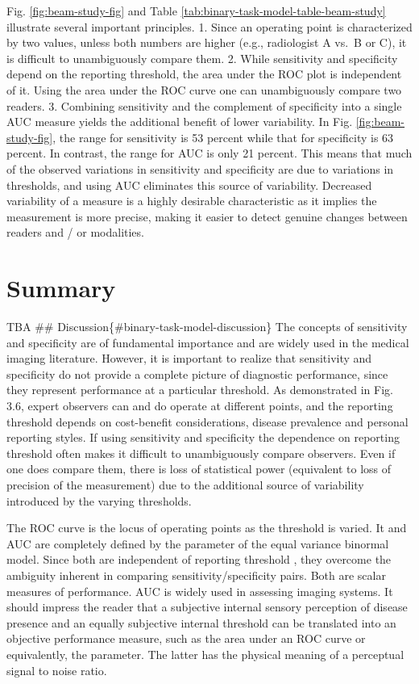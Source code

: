 \documentclass[
]{book}
\begin{document}
Fig. \ref{fig:beam-study-fig} and Table \ref{tab:binary-task-model-table-beam-study} illustrate several important principles.
1. Since an operating point is characterized by two values, unless both numbers are higher (e.g., radiologist A vs.~B or C), it is difficult to unambiguously compare them.
2. While sensitivity and specificity depend on the reporting threshold, the area under the ROC plot is independent of it. Using the area under the ROC curve one can unambiguously compare two readers.
3. Combining sensitivity and the complement of specificity into a single AUC measure yields the additional benefit of lower variability. In Fig. \ref{fig:beam-study-fig}, the range for sensitivity is 53 percent while that for specificity is 63 percent. In contrast, the range for AUC is only 21 percent. This means that much of the observed variations in sensitivity and specificity are due to variations in thresholds, and using AUC eliminates this source of variability. Decreased variability of a measure is a highly desirable characteristic as it implies the measurement is more precise, making it easier to detect genuine changes between readers and / or modalities.

\hypertarget{binary-task-model-summary}{%
\section{Summary}\label{binary-task-model-summary}}

TBA
\#\# Discussion\{\#binary-task-model-discussion\}
The concepts of sensitivity and specificity are of fundamental importance and are widely used in the medical imaging literature. However, it is important to realize that sensitivity and specificity do not provide a complete picture of diagnostic performance, since they represent performance at a particular threshold. As demonstrated in Fig. 3.6, expert observers can and do operate at different points, and the reporting threshold depends on cost-benefit considerations, disease prevalence and personal reporting styles. If using sensitivity and specificity the dependence on reporting threshold often makes it difficult to unambiguously compare observers. Even if one does compare them, there is loss of statistical power (equivalent to loss of precision of the measurement) due to the additional source of variability introduced by the varying thresholds.

The ROC curve is the locus of operating points as the threshold is varied. It and AUC are completely defined by the parameter of the equal variance binormal model. Since both are independent of reporting threshold , they overcome the ambiguity inherent in comparing sensitivity/specificity pairs. Both are scalar measures of performance. AUC is widely used in assessing imaging systems. It should impress the reader that a subjective internal sensory perception of disease presence and an equally subjective internal threshold can be translated into an objective performance measure, such as the area under an ROC curve or equivalently, the parameter. The latter has the physical meaning of a perceptual signal to noise ratio.
\end{document}
